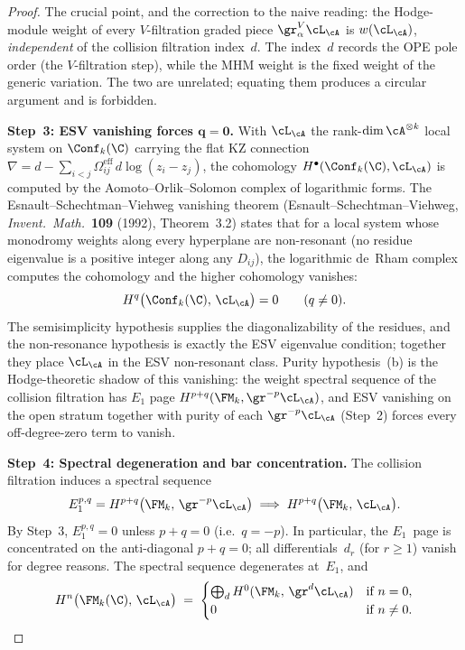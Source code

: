 \begin{proof}
The crucial point, and the correction to the naive reading: the
Hodge-module weight of every $V$-filtration graded piece
$\gr^V_\alpha\cL_\cA$ is $w(\cL_\cA)$, \emph{independent} of the
collision filtration index~$d$. The index~$d$ records the OPE pole
order (the $V$-filtration step), while the MHM weight is the fixed
weight of the generic variation. The two are unrelated; equating
them produces a circular argument and is forbidden.

\medskip\noindent\textbf{Step~3: ESV vanishing forces
$\boldsymbol{q = 0}$.}
With $\cL_\cA$ the rank-$\dim\cA^{\otimes k}$ local system on
$\Conf_k(\C)$ carrying the flat KZ connection
$\nabla = d - \sum_{i<j}\Omega_{ij}^{\mathrm{eff}}\,d\log(z_i-z_j)$,
the cohomology $H^\bullet(\Conf_k(\C),\cL_\cA)$ is computed by the
Aomoto--Orlik--Solomon complex of logarithmic forms. The
Esnault--Schechtman--Viehweg vanishing theorem
(Esnault--Schechtman--Viehweg, \emph{Invent.\ Math.}\ \textbf{109}
(1992), Theorem~3.2) states that for a local system whose
monodromy weights along every hyperplane are non-resonant
(no residue eigenvalue is a positive integer along any
$D_{ij}$), the logarithmic de~Rham complex computes the cohomology
and the higher cohomology vanishes:
\[
H^q\bigl(\Conf_k(\C),\,\cL_\cA\bigr) = 0
\qquad (q \neq 0).
\]
The semisimplicity hypothesis supplies the diagonalizability of the
residues, and the non-resonance hypothesis is exactly the ESV
eigenvalue condition; together they place $\cL_\cA$ in the ESV
non-resonant class. Purity hypothesis~(b) is the Hodge-theoretic
shadow of this vanishing: the weight spectral sequence of the
collision filtration has $E_1$ page $H^{p+q}(\FM_k,\gr^{-p}\cL_\cA)$,
and ESV vanishing on the open stratum together with purity of each
$\gr^{-p}\cL_\cA$ (Step~2) forces every off-degree-zero term to
vanish.

\medskip\noindent\textbf{Step~4: Spectral degeneration and
bar concentration.}
The collision filtration induces a spectral sequence
\[
E_1^{p,q} = H^{p+q}\bigl(\FM_k,\,\gr^{-p}\cL_\cA\bigr)
\;\Longrightarrow\;
H^{p+q}\bigl(\FM_k,\,\cL_\cA\bigr).
\]
By Step~3, $E_1^{p,q} = 0$ unless $p + q = 0$ (i.e.\ $q = -p$).
In particular, the $E_1$~page is concentrated on the anti-diagonal
$p + q = 0$; all differentials~$d_r$ (for $r \geq 1$)
vanish for degree reasons. The spectral sequence degenerates
at~$E_1$, and
\[
H^n\bigl(\FM_k(\C),\,\cL_\cA\bigr)
\;=\;
\begin{cases}
\bigoplus_d H^0(\FM_k,\,\gr^d\cL_\cA) & \text{if } n = 0, \\
0 & \text{if } n \neq 0.
\end{cases}
\]


\end{proof}
